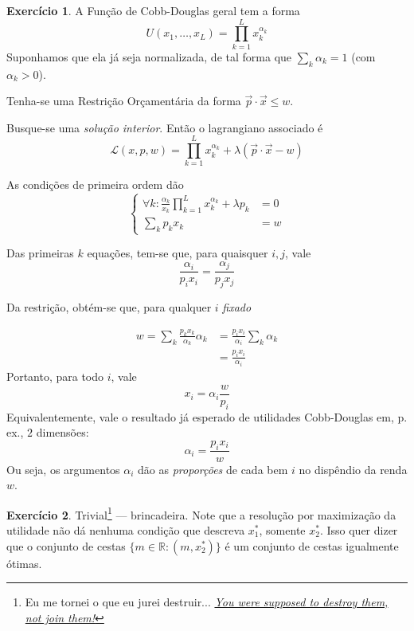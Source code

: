 \documentclass[12pt]{article}
\numberwithin{equation}{section}
\theoremstyle{plain}
\theoremstyle{definition}
\newtheorem{exercise}{Exercício}
\theoremstyle{remark}
\begin{document}
\begin{exercise}
    A Função de Cobb-Douglas geral tem a forma \[
U(x_{1},\dots,x_{L}) = \prod \limits_{k=1}^{L} x_{k}^{\alpha_{k}}
\] Suponhamos que ela já seja normalizada, de tal forma que
\(\sum_{k} \alpha_{k} = 1\) (com \(\alpha_{k} > 0\)).

Tenha-se uma Restrição Orçamentária da forma
\(\vec{p} \cdot \vec{x} \leq w\).

Busque-se uma \textit{solução interior}. Então o lagrangiano associado é
\[
\mathcal{L}(x, p, w) = \prod \limits_{k=1}^{L} x_{k}^{\alpha_{k}} + \lambda \left(\vec{p} \cdot \vec{x} - w\right)
\]

As condições de primeira ordem dão \[
\begin{cases}
\forall k: \frac{\alpha_{k}}{x_{k}} \prod \limits_{k=1}^{L} x_{k}^{\alpha_{k}}  + \lambda p_{k} &= 0\\
\sum \limits_{k} p_{k} x_{k} &= w
\end{cases}
\]

Das primeiras $k$ equações, tem-se que, para quaisquer \(i, j\), vale \[
\frac{\alpha_{i}}{p_{i} x_{i}} = \frac{\alpha_{j}}{p_{j} x_{j}}
\]

Da restrição, obtém-se que, para qualquer \(i\) \textit{fixado} 

\begin{align}
w = \sum\limits_{k} \frac{p_{k} x_{k}}{\alpha_{k}} \alpha_{k} &= \frac{p_{i} x_{i}}{\alpha_{i}} \sum \limits_{k} \alpha_{k}  \\
&= \frac{p_{i} x_{i}}{\alpha_{i}}
\end{align}
Portanto, para todo \(i\), vale 
\[
x_{i} = \alpha_{i} \frac{w}{p_{i}}
\] 
Equivalentemente, vale o resultado já esperado de utilidades
Cobb-Douglas em, p. ex., $2$ dimensões: 
\[
\alpha_{i} = \frac{p_{i} x_{i}}{w}
\] 
Ou seja, os argumentos \(\alpha_{i}\) dão as \textit{proporções} de
cada bem \(i\) no dispêndio da renda \(w\).

\end{exercise}

\begin{exercise}
    Trivial\footnote{Eu me tornei o que eu jurei destruir... \href{https://www.youtube.com/watch?v=dQw4w9WgXcQ}{\textit{You were supposed to destroy them, not join them!}}} --- brincadeira. Note que a resolução por maximização da utilidade não dá nenhuma condição que descreva $x_1^*$, somente $x_2^*$. Isso quer dizer que o conjunto de cestas $\{ m \in \mathbb{R}: (m, x_2^*) \}$ é um conjunto de cestas igualmente ótimas.
\end{exercise}
\end{document}
